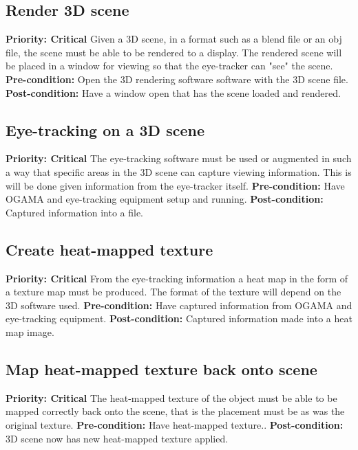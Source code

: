 \subsection{Render 3D scene}
    \textbf{Priority: Critical}\newline
    Given a 3D scene, in a format such as a blend file or an obj file, the scene must be able to be rendered to a display. The rendered scene will be placed in a window for viewing so that the eye-tracker can "see" the scene.\newline
    \textbf{Pre-condition: }
    Open the 3D rendering software software with the 3D scene file.\newline
    \textbf{Post-condition: }
    Have a window open that has the scene loaded and rendered.
    
\subsection{Eye-tracking on a 3D scene}
    \textbf{Priority: Critical}\newline
    The eye-tracking software must be used or augmented in such a way that specific areas in the 3D scene can capture viewing information. This is will be done given information from the eye-tracker itself.\newline
    \textbf{Pre-condition: }
    Have OGAMA and eye-tracking equipment setup and running.\newline
    \textbf{Post-condition: }
    Captured information into a file.
\subsection{Create heat-mapped texture}
    \textbf{Priority: Critical}\newline
    From the eye-tracking information a heat map in the form of a texture map must be produced. The format of the texture will depend on the 3D software used.\newline
    \textbf{Pre-condition: }
    Have captured information from OGAMA and eye-tracking equipment.\newline
    \textbf{Post-condition: }
    Captured information made into a heat map image.
\subsection{Map heat-mapped texture back onto scene}
    \textbf{Priority: Critical}\newline
    The heat-mapped texture of the object must be able to be mapped correctly back onto the scene, that is the placement must be as was the original texture.\newline
    \textbf{Pre-condition: }
    Have heat-mapped texture..\newline
    \textbf{Post-condition: }
    3D scene now has new heat-mapped texture applied.
